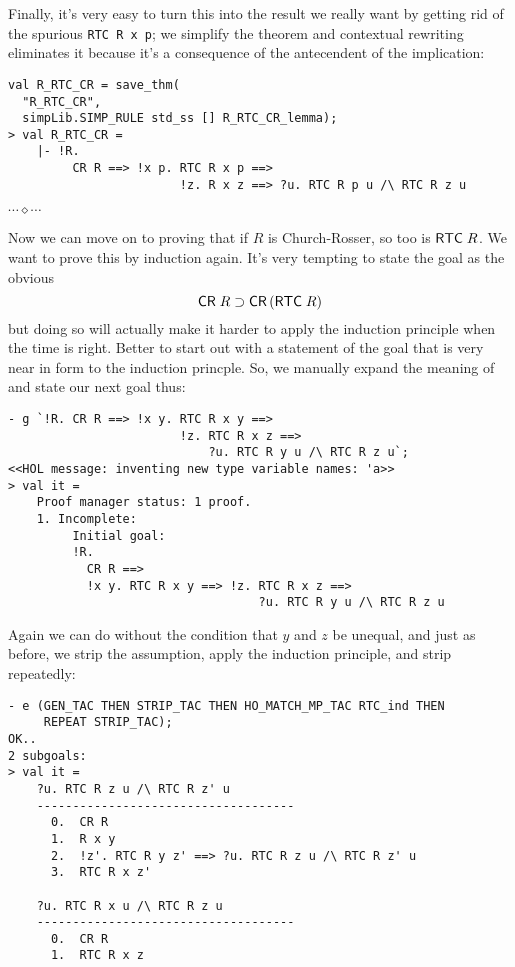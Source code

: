 \documentclass[12pt]{article}
\newcommand{\eos}{\hfill{}$\cdots\diamond\cdots$\hfill{}\vspace{5mm}}
\begin{document}
    Finally, it's very easy to turn this into the result we really
    want by getting rid of the spurious \texttt{RTC R x p}; we
    simplify the theorem and contextual rewriting eliminates it
    because it's a consequence of the antecendent of the implication:
\begin{session}\begin{verbatim}
val R_RTC_CR = save_thm(
  "R_RTC_CR",
  simpLib.SIMP_RULE std_ss [] R_RTC_CR_lemma);
> val R_RTC_CR =
    |- !R.
         CR R ==> !x p. RTC R x p ==>
                        !z. R x z ==> ?u. RTC R p u /\ RTC R z u
\end{verbatim}\end{session}
\eos{}

Now we can move on to proving that if $R$ is Church-Rosser, so too is
${\sf RTC}\;R$.  We want to prove this by induction again.  It's very
tempting to state the goal as the obvious \[
{\sf CR}\;R\supset{\sf CR}\,({\sf RTC}\;R)
\] but doing so will actually make it harder to apply the induction
principle when the time is right.  Better to start out with a
statement of the goal that is very near in form to the induction
princple.  So, we manually expand the meaning of  and state
our next goal thus:
\begin{session}\begin{verbatim}
- g `!R. CR R ==> !x y. RTC R x y ==>
                        !z. RTC R x z ==>
                            ?u. RTC R y u /\ RTC R z u`;
<<HOL message: inventing new type variable names: 'a>>
> val it =
    Proof manager status: 1 proof.
    1. Incomplete:
         Initial goal:
         !R.
           CR R ==>
           !x y. RTC R x y ==> !z. RTC R x z ==>
                                   ?u. RTC R y u /\ RTC R z u
\end{verbatim}\end{session}
    Again we can do without the condition that $y$ and $z$ be unequal,
    and just as before, we strip the  assumption, apply the
    induction principle, and strip repeatedly:
\begin{session}\begin{verbatim}
- e (GEN_TAC THEN STRIP_TAC THEN HO_MATCH_MP_TAC RTC_ind THEN
     REPEAT STRIP_TAC);
OK..
2 subgoals:
> val it =
    ?u. RTC R z u /\ RTC R z' u
    ------------------------------------
      0.  CR R
      1.  R x y
      2.  !z'. RTC R y z' ==> ?u. RTC R z u /\ RTC R z' u
      3.  RTC R x z'

    ?u. RTC R x u /\ RTC R z u
    ------------------------------------
      0.  CR R
      1.  RTC R x z
\end{verbatim}\end{session}
\end{document}
